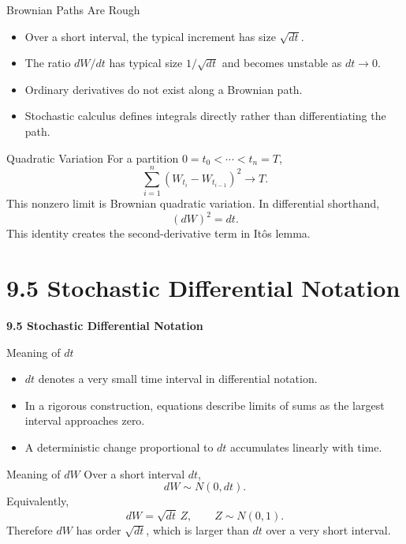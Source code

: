 \documentclass[aspectratio=169]{beamer}
\begin{document}
\begin{frame}[t]{Brownian Paths Are Rough}
\justifying
\begin{itemize}
\item Over a short interval, the typical increment has size $\sqrt{dt}$.
\item The ratio $dW/dt$ has typical size $1/\sqrt{dt}$ and becomes unstable as $dt\to0$.
\item Ordinary derivatives do not exist along a Brownian path.
\item Stochastic calculus defines integrals directly rather than differentiating the path.
\end{itemize}
\end{frame}

\begin{frame}[t]{Quadratic Variation}
\justifying
For a partition $0=t_0<\cdots<t_n=T$,
\[\sum_{i=1}^{n}(W_{t_i}-W_{t_{i-1}})^2\to T.\]
This nonzero limit is Brownian quadratic variation. In differential shorthand,
\[(dW)^2=dt.\]
This identity creates the second-derivative term in It\^o\textquotesingle s lemma.
\end{frame}

\section{9.5 Stochastic Differential Notation}
\begin{frame}[plain]
\centering\vfill
{\color{TitleBlue}\Large\bfseries 9.5 Stochastic Differential Notation}\par
\vspace{0.5cm}{\large What $dt$, $dW$, and $dS$ actually mean}\par
\vfill\end{frame}

\begin{frame}[t]{Meaning of $dt$}
\justifying
\begin{itemize}
\item $dt$ denotes a very small time interval in differential notation.
\item In a rigorous construction, equations describe limits of sums as the largest interval approaches zero.
\item A deterministic change proportional to $dt$ accumulates linearly with time.
\end{itemize}
\end{frame}

\begin{frame}[t]{Meaning of $dW$}
\justifying
Over a short interval $dt$,
\[dW\sim N(0,dt).\]
Equivalently,
\[dW=\sqrt{dt}\,Z,\qquad Z\sim N(0,1).\]
Therefore $dW$ has order $\sqrt{dt}$, which is larger than $dt$ over a very short interval.
\end{frame}
\end{document}

